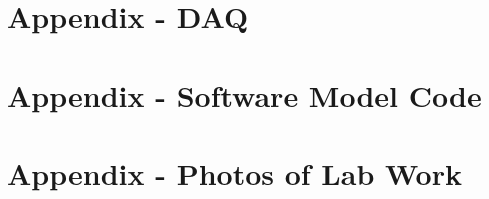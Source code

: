 \documentclass[12pt,a4paper]{scrreprt}
\begin{document}
\onehalfspacing

\begin{titlepage}
    \maketitle
    \thispagestyle{empty}
\end{titlepage}

\tableofcontents
\thispagestyle{empty}
\clearpage

\listoffigures
\thispagestyle{empty}

\listoftables
\thispagestyle{empty}

\listofequations




\clearpage















\appendix
\chapter{Appendix - DAQ}


\chapter{Appendix - Software Model Code}


\chapter{Appendix - Photos of Lab Work}

\end{document}
